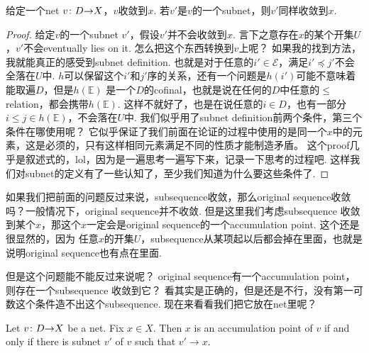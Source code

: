 \begin{proposition}
\rm 给定一个net ${v}\colon{D}{\to}{X}$，$v$收敛到$x$. 若$v'$是$v$的一个subnet，则$v'$同样收敛到$x$. 
\end{proposition} 

\begin{proof}
给定$v$的一个subnet $v'$，假设$v'$并不会收敛到$x$. 言下之意存在$x$的某个开集$U$，$v'$不会eventually lies on it. 怎么把这个东西转换到$v$上呢？ 如果我的找到方法，我就能真正的感受到subnet definition.  也就是对于任意的$i' \in \mathcal{E}$，满足$i' \preceq j'$不会全落在$U$中. $h$可以保留这个$i'$和$j'$序的关系，还有一个问题是$h(i')$可能不意味着能取遍$D$，但是$h(\mathbb{E})$ 是一个$D$的cofinal，也就是说在任何的$D$中任意的$\leq$ relation，都会携带$h(\mathbb{E})$. 这样不就好了，也是在说任意的$i \in D$，也有一部分$i \leq j \in h(\mathbb{E})$，不会落在$U$中. 我们似乎用了subnet definition前两个条件，第三个条件在哪使用呢？ 它似乎保证了我们前面在论证的过程中使用的是同一个$x$中的元素，这是必须的，只有这样相同元素满足不同的性质才能制造矛盾。 这个proof几乎是叙述式的，lol，因为是一遍思考一遍写下来，记录一下思考的过程吧. 这样我们对subnet的定义有了一些认知了，至少我们知道为什么要这些条件了.
\end{proof}

如果我们把前面的问题反过来说，subsequence收敛，那么original sequence收敛吗？一般情况下，original sequence并不收敛. 但是这里我们考虑subsequence 收敛到某个$x$，那这个$x$一定会是original sequence的一个accumulation point. 这个还是很显然的，因为
任意$x$的开集$U$，subsequence从某项起以后都会掉在里面，也就是说明original sequence也有点在里面.


但是这个问题能不能反过来说呢？ original sequence有一个accumulation point，则存在一个subsequence 收敛到它？ 看其实是正确的，但是还是不行，没有第一可数这个条件造不出这个subsequence. 现在来看看我们把它放在net里呢？

\begin{theorem}
Let ${v}\colon{D}{\to}{X}$ be a net. Fix $x \in X$. Then $x$ is an accumulation point of $v$ if and only if there is subnet $v'$ of $v$ such that $v' \rightarrow x$.	
\end{theorem}


